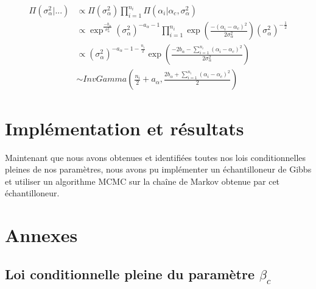 \documentclass[
]{article}
\begin{document}
\begin{align*}
\Pi(\sigma_{\alpha}^{2}|...) &\propto \Pi(\sigma_{\alpha}^{2}) \prod_{i=1}^{n_{i}}\Pi(\alpha_{i}|\alpha_{c},\sigma_{\alpha}^{2}) \\
&\propto \exp^{\frac{-b_{\alpha}}{\sigma_{\alpha}^{2}}}(\sigma_{\alpha}^{2})^{-a_{\alpha}-1}\prod_{i=1}^{n_{i}} \exp\left(\frac{-(\alpha_{i}-\alpha_{c})^{2}}{2\sigma_{\alpha}^{2}}\right)(\sigma_{\alpha}^{2})^{-\frac{1}{2}}\\
&\propto (\sigma_{\alpha}^{2})^{-a_{\alpha}-1-\frac{n_{i}}{2}}\exp\left(\frac{-2b_{\alpha}-\sum\limits_{i=1}^{n_{i}}(\alpha_{i}-\alpha_{c})^{2}}{2\sigma_{\alpha}^{2}}\right)\\
&\sim InvGamma(\frac{n_{i}}{2}+a_{\alpha},\frac{2b_{\alpha}+\sum\limits_{i=1}^{n_{i}}(\alpha_{i}-\alpha_{c})^{2}}{2})
\end{align*}

\hypertarget{impluxe9mentation-et-ruxe9sultats}{%
\section{Implémentation et
résultats}\label{impluxe9mentation-et-ruxe9sultats}}

Maintenant que nous avons obtenues et identifiées toutes nos lois
conditionnelles pleines de nos paramètres, nous avons pu implémenter un
échantilloneur de Gibbs et utiliser un algorithme MCMC sur la chaîne de
Markov obtenue par cet échantilloneur.

\newpage

\hypertarget{annexes}{%
\section{Annexes}\label{annexes}}

\hypertarget{loi-conditionnelle-pleine-du-paramuxe8tre-beta_c}{%
\subsection{\texorpdfstring{Loi conditionnelle pleine du paramètre
\(\beta_c\)}{Loi conditionnelle pleine du paramètre \textbackslash beta\_c}}\label{loi-conditionnelle-pleine-du-paramuxe8tre-beta_c}}
\end{document}
